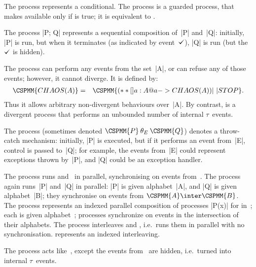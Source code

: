 The process  represents a conditional. 
The process  is a guarded process, that makes  available
only if  is true; it is equivalent to .

The process |P; Q| represents a sequential composition of~|P| and~|Q|:
initially, |P| is run, but when it terminates (as indicated by event~$\tick$),
|Q| is run (but the $\tick$ is hidden). 

The process  can perform any events from the set~|A|, or can
refuse any of those events; however, it cannot diverge.  It is defined by:
\begin{eqnarray*}
\CSPMM{CHAOS(A)} & = & \CSPMM{(**[] a:A @ a -> CHAOS(A)) |~| STOP}.
\end{eqnarray*}
Thus it allows arbitrary non-divergent behaviours over~|A|.  By contrast,
 is a divergent process that performs an unbounded number of
internal $\tau$~events.

The process \CSPM{P [|E|> Q} 
(sometimes denoted $\CSPMM{P} \mathbin{\theta_E} \CSPMM{Q}$) denotes a
  throw-catch mechanism: initially, |P| is executed, but if it performs an
  event from~|E|, control is passed to~|Q|; for example, the events from~|E|
  could represent exceptions thrown by~|P|, and |Q| could be an exception
  handler.

The process  runs  and~ in parallel,
synchronising on events from~.  The process  again
runs~|P| and~|Q| in parallel: |P| is given alphabet~|A|, and |Q| is given
alphabet~|B|; they synchronise on events from $\CSPMM{A} \inter \CSPMM{B}$.
%
The process  represents an indexed parallel composition of processes |P(x)| for
 in~; each  is given alphabet~;
processes synchronize on events in the intersection of their alphabets.
The process  interleaves  and , i.e.\ runs them
in parallel with no synchronisation.   represents an
indexed interleaving.

The process  acts like~, except the events from~
are hidden, i.e.~turned into internal $\tau$~events.  
%

